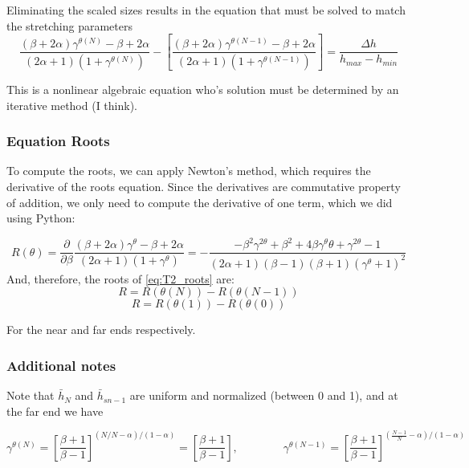 \documentclass[11pt]{article}
\newcommand{\g}{\gamma}
\begin{document}
Eliminating the scaled sizes results in the equation that must be solved to match the stretching parameters
\begin{equation} \label{eq:T2_roots}
	\boxed{
	\frac{(\beta+2\alpha)\g^{\theta(N)} - \beta + 2\alpha}{(2\alpha+1) \left(1+\g^{\theta(N)} \right)}
	-
	\left[
	\frac{(\beta+2\alpha)\g^{\theta(N-1)} - \beta + 2\alpha}{(2\alpha+1) \left(1+\g^{\theta(N-1)} \right)}
	\right]
	=
	\frac{\Delta h}{h_{max}-h_{min}}
	}
\end{equation}

This is a nonlinear algebraic equation who's solution must be determined by an iterative method (I think).

\subsubsection{Equation Roots}
To compute the roots, we can apply Newton's method, which requires the derivative of the roots equation. Since the derivatives are commutative property of addition, we only need to compute the derivative of one term, which we did using Python:

\begin{equation} \label{eq:T2_prime}
	R(\theta) = \frac{\partial}{\partial \beta}
	\frac{(\beta+2\alpha)\g^{\theta} - \beta + 2\alpha}{(2\alpha+1) \left(1+\g^{\theta} \right)}
	= - \frac{- \beta^{2} \g^{2 \theta} + \beta^{2} + 4 \beta \g^{\theta} \theta + \g^{2 \theta} - 1}{\left(2 \alpha + 1\right) \left(\beta - 1\right) \left(\beta + 1\right) \left(\g^{\theta} + 1\right)^{2}}
\end{equation}
And, therefore, the roots of \ref{eq:T2_roots} are:
\begin{equation}
	R = R(\theta(N)) - R(\theta(N-1))
\end{equation}
\begin{equation}
	R = R(\theta(1)) - R(\theta(0))
\end{equation}

For the near and far ends respectively.

\subsubsection{Additional notes}
Note that $\bar{h}_{N}$ and $\bar{h}_{sn-1}$ are uniform and normalized (between 0 and 1), and at the far end we have

\begin{equation}
	\g^{\theta(N)} = \left[ 
	\frac{\beta+1}{\beta-1}
	\right]^{(N/N-\alpha)/(1-\alpha)} = 
	\left[ 
	\frac{\beta+1}{\beta-1}
	\right]
	, \qquad \qquad
	\g^{\theta(N-1)} = \left[ 
	\frac{\beta+1}{\beta-1}
	\right]^{(\frac{N-1}{N}-\alpha)/(1-\alpha)}
\end{equation}
\end{document}
